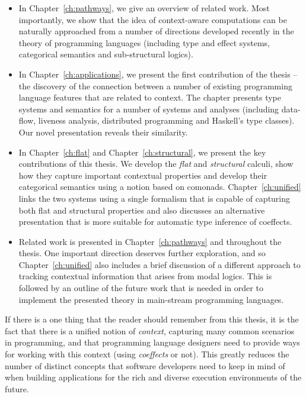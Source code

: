 \begin{itemize}
\item In Chapter~\ref{ch:pathways}, we give an overview of related work. Most importantly, we show
  that the idea of context-aware computations can be naturally approached from a number of
  directions developed recently in the theory of programming languages (including type and effect
  systems, categorical semantics and sub-structural logics).

\item In Chapter~\ref{ch:applications}, we present the first contribution of the thesis -- the discovery
  of the connection between a number of existing programming language features that are related
  to context. The chapter presents type systems and semantics for a number of systems and analyses 
  (including data-flow, liveness analysis, distributed programming and Haskell's type classes).
  Our novel presentation reveals their similarity.

\item In Chapter~\ref{ch:flat} and Chapter~\ref{ch:structural}, we present the key
  contributions of this thesis. We develop the \emph{flat} and \emph{structural} calculi, show
  how they capture important contextual properties and develop their categorical semantics using
  a notion based on comonads. Chapter~\ref{ch:unified}  links the two systems using a single 
  formalism that is capable of capturing both flat and structural properties and also discusses
  an alternative presentation that is more suitable for automatic type inference of coeffects.

\item Related work is presented in Chapter~\ref{ch:pathways} and throughout the thesis. 
  One important direction deserves further exploration, and so Chapter~\ref{ch:unified}
  also includes a brief discussion of a different approach to tracking contextual information that 
  arises from modal logics. This is followed by an outline of the future work that is needed
  in order to implement the presented theory in main-stream programming languages.
\end{itemize}

\noindent
If there is a one thing that the reader should remember from this thesis, it is the fact that
there is a unified notion of \emph{context}, capturing many common scenarios in programming, 
and that programming language designers need to provide ways for working with this context (using 
\emph{coeffects} or not). This greatly reduces the number of distinct concepts that software 
developers need to keep in mind of when building applications for the rich and diverse 
execution environments of the future.